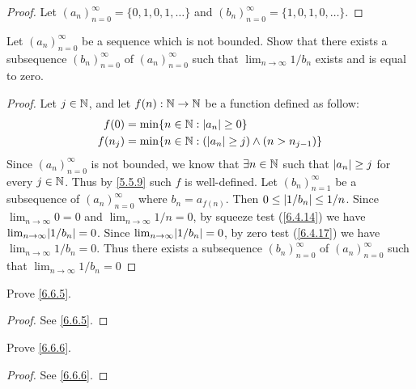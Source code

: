 \begin{proof}
  Let \((a_n)_{n = 0}^\infty = \{0, 1, 0, 1, \dots\}\) and \((b_n)_{n = 0}^\infty = \{1, 0, 1, 0, \dots\}\).
\end{proof}

\begin{ex}\label{ex:6.6.3}
  Let \((a_n)_{n = 0}^\infty\) be a sequence which is not bounded.
  Show that there exists a subsequence \((b_n)_{n = 0}^\infty\) of \((a_n)_{n = 0}^\infty\) such that \(\lim_{n \to \infty} 1 / b_n\) exists and is equal to zero.
\end{ex}

\begin{proof}
  Let \(j \in \mathbb{N}\), and let \(f(n) : \mathbb{N} \to \mathbb{N}\) be a function defined as follow:
  \begin{align*}
    f(0)   & = \min\{n \in \mathbb{N} : \left\lvert a_n\right\rvert \geq 0\}                         \\
    f(n_j) & = \min\{n \in \mathbb{N} : (\left\lvert a_n\right\rvert \geq j) \land (n > n_{j - 1})\}
  \end{align*}
  Since \((a_n)_{n = 0}^\infty\) is not bounded, we know that \(\exists n \in \mathbb{N}\) such that \(\left\lvert a_n\right\rvert \geq j\) for every \(j \in \mathbb{N}\).
  Thus by \cref{5.5.9} such \(f\) is well-defined.
  Let \((b_n)_{n = 1}^\infty\) be a subsequence of \((a_n)_{n = 0}^\infty\) where \(b_n = a_{f(n)}\).
  Then \(0 \leq \left\lvert1 / b_n\right\rvert \leq 1 / n\).
  Since \(\lim_{n \to \infty} 0 = 0\) and \(\lim_{n \to \infty} 1 / n = 0\), by squeeze test (\cref{6.4.14}) we have \(\lim_{n \to \infty} \abs{1 / b_n} = 0\).
  Since \(\lim_{n \to \infty} \abs{1 / b_n} = 0\), by zero test (\cref{6.4.17}) we have \(\lim_{n \to \infty} 1 / b_n = 0\).
  Thus there exists a subsequence \((b_n)_{n = 0}^\infty\) of \((a_n)_{n = 0}^\infty\) such that \(\lim_{n \to \infty} 1 / b_n = 0\)
\end{proof}

\begin{ex}\label{ex:6.6.4}
  Prove \cref{6.6.5}.
\end{ex}

\begin{proof}
  See \cref{6.6.5}.
\end{proof}

\begin{ex}\label{ex:6.6.5}
  Prove \cref{6.6.6}.
\end{ex}

\begin{proof}
  See \cref{6.6.6}.
\end{proof}